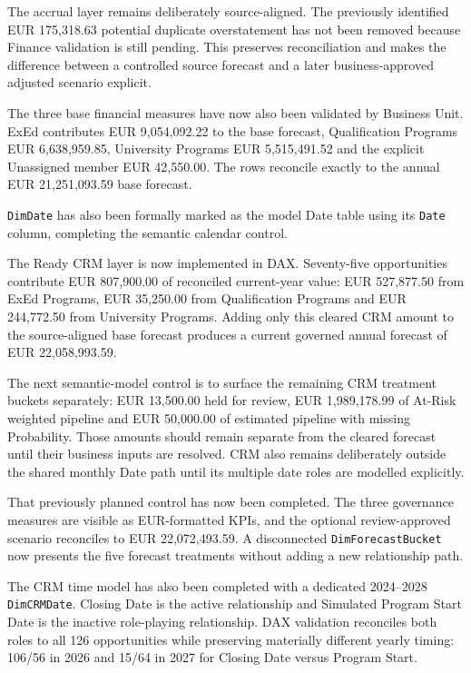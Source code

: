 \documentclass[11pt,a4paper]{article}
\begin{document}
\begin{summarybox}
The accrual layer remains deliberately source-aligned. The previously identified
EUR 175,318.63 potential duplicate overstatement has not been removed because
Finance validation is still pending. This preserves reconciliation and makes the
difference between a controlled source forecast and a later business-approved
adjusted scenario explicit.

The three base financial measures have now also been validated by Business Unit.
ExEd contributes EUR 9,054,092.22 to the base forecast, Qualification Programs
EUR 6,638,959.85, University Programs EUR 5,515,491.52 and the explicit
Unassigned member EUR 42,550.00. The rows reconcile exactly to the annual
EUR 21,251,093.59 base forecast.

\texttt{DimDate} has also been formally marked as the model Date table using its
\texttt{Date} column, completing the semantic calendar control.

The Ready CRM layer is now implemented in DAX. Seventy-five opportunities
contribute EUR 807,900.00 of reconciled current-year value: EUR 527,877.50 from
ExEd Programs, EUR 35,250.00 from Qualification Programs and EUR 244,772.50
from University Programs. Adding only this cleared CRM amount to the
source-aligned base forecast produces a current governed annual forecast of
EUR 22,058,993.59.

The next semantic-model control is to surface the remaining CRM treatment
buckets separately: EUR 13,500.00 held for review, EUR 1,989,178.99 of
At-Risk weighted pipeline and EUR 50,000.00 of estimated pipeline with missing
Probability. Those amounts should remain separate from the cleared forecast
until their business inputs are resolved. CRM also remains deliberately outside
the shared monthly Date path until its multiple date roles are modelled
explicitly.

That previously planned control has now been completed. The three governance
measures are visible as EUR-formatted KPIs, and the optional review-approved
scenario reconciles to EUR 22,072,493.59. A disconnected
\texttt{DimForecastBucket} now presents the five forecast treatments without
adding a new relationship path.

The CRM time model has also been completed with a dedicated 2024--2028
\texttt{DimCRMDate}. Closing Date is the active relationship and Simulated
Program Start Date is the inactive role-playing relationship. DAX validation
reconciles both roles to all 126 opportunities while preserving materially
different yearly timing: 106/56 in 2026 and 15/64 in 2027 for Closing Date
versus Program Start.


\end{summarybox}
\end{document}
